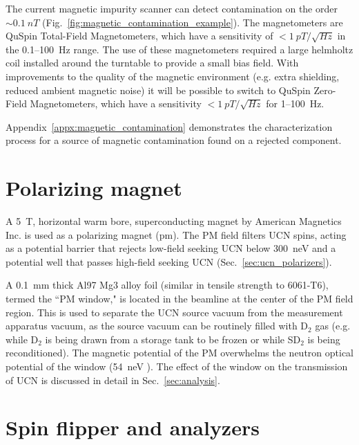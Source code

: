 The current magnetic impurity scanner can detect contamination on the order $\sim\qty{0.1}{nT}$ (Fig.~\ref{fig:magnetic_contamination_example}). The magnetometers are QuSpin Total-Field Magnetometers, which have a sensitivity of $<\qty{1}{pT\per\sqrt{Hz}}$ in the 0.1--\qty{100}{\hertz} range. The use of these magnetometers required a large helmholtz coil installed around the turntable to provide a small bias field. With improvements to the quality of the magnetic environment (e.g. extra shielding, reduced ambient magnetic noise) it will be possible to switch to QuSpin Zero-Field Magnetometers, which have a sensitivity $<\qty{1}{pT\per\sqrt{Hz}}$ for 1--\qty{100}{\hertz}.

Appendix~\ref{appx:magnetic_contamination} demonstrates the characterization process for a source of magnetic contamination found on a rejected component.


\section{Polarizing magnet}\label{sec:PM_description}


A \qty{5}{\tesla}, horizontal warm bore, superconducting magnet by American Magnetics Inc. is used as a polarizing magnet (\acrshort*{pm}). The PM field filters UCN spins, acting as a potential barrier that rejects low-field seeking UCN below \qty{300}{\nano\eV} and a potential well that passes high-field seeking UCN (Sec.~\ref{sec:ucn_polarizers}). 

A \qty{0.1}{\milli\meter} thick Al97 Mg3 alloy foil (similar in tensile strength to 6061-T6), termed the ``PM window," is located in the beamline at the center of the PM field region. This is used to separate the UCN source vacuum from the measurement apparatus vacuum, as the source vacuum can be routinely filled with D$_2$ gas (e.g. while D$_2$ is being drawn from a storage tank to be frozen or while SD$_2$ is being reconditioned). The magnetic potential of the PM overwhelms the neutron optical potential of the window (\qty{54}{\nano\eV} \cite{golubUCN}). The effect of the window on the transmission of UCN is discussed in detail in Sec.~\ref{sec:analysis}.


\section{Spin flipper and analyzers}\label{sec:spin_flipper_analyzer}

